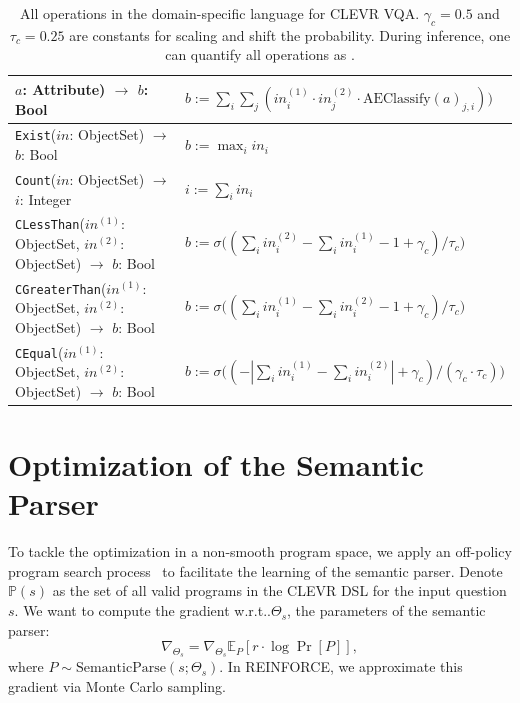 \documentclass{article} %
\makeatletter
\newcommand{\E}{\mathbb{E}}
\DeclareRobustCommand\onedot{\futurelet\@let@token\@onedot}
\def\@onedot{\ifx\@let@token.\else.\null\fi\xspace}
\def\wrt{w.r.t\onedot} \def\dof{d.o.f\onedot}
\makeatother
\begin{document}
\begin{table}[ht]
\begin{tabular}{p{}l}
        \hspace*{0.8cm} $a$: Attribute) $\rightarrow$ $b$: Bool & $b := \sum_{i} \sum_j (in^{(1)}_i \cdot in^{(2)}_j \cdot \mathrm{AEClassify}(a)_{j, i}))$\\ \midrule
        {\tt Exist}($in$: ObjectSet) $\rightarrow$ $b$: Bool & $b := \max_i in_i$\\ \midrule
        {\tt Count}($in$: ObjectSet) $\rightarrow$ $i$: Integer & $i := \sum_i in_i$\\ \midrule
        {\tt CLessThan}($in^{(1)}$: ObjectSet,\newline
        \hspace*{0.8cm}  $in^{(2)}$: ObjectSet) $\rightarrow$ $b$: Bool & $b := \sigma\big(( \sum_i in^{(2)}_i - \sum_i in^{(1)}_i - 1 + \gamma_c)/\tau_c\big)$\\ \midrule
        {\tt CGreaterThan}($in^{(1)}$: ObjectSet,\newline
        \hspace*{0.8cm}  $in^{(2)}$: ObjectSet) $\rightarrow$ $b$: Bool & $b := \sigma\big(( \sum_i in^{(1)}_i - \sum_i in^{(2)}_i - 1 + \gamma_c)/\tau_c\big)$\\ \midrule
        {\tt CEqual}($in^{(1)}$: ObjectSet,\newline
        \hspace*{0.8cm}  $in^{(2)}$: ObjectSet) $\rightarrow$ $b$: Bool & $b := \sigma\big(( -|\sum_i in^{(1)}_i - \sum_i in^{(2)}_i| + \gamma_c)/(\gamma_c \cdot \tau_c) \big)$\\ \midrule
    \end{tabular}
    \caption{All operations in the domain-specific language for CLEVR VQA. $\gamma_c=0.5$ and $\tau_c=0.25$ are constants for scaling and shift the probability. During inference, one can quantify all operations as \citet{kexin}.}
    \label{tab:program-executor}
\end{table}

\section{Optimization of the Semantic Parser}
\label{sec:app:reinforce}
To tackle the optimization in a non-smooth program space, we apply an off-policy program search process~\citep{Sutton2000Policy} to facilitate the learning of the semantic parser. Denote $\mathbb P(s)$ as the set of all valid programs in the CLEVR DSL for the input question $s$. We want to compute the gradient \wrt $\Theta_s$, the parameters of the semantic parser:
\[\nabla_{\Theta_s} = \nabla_{\Theta_s} \E_{P}[ r \cdot \log \Pr[P]],\]
where $P \sim \mathrm{SemanticParse}(s; {\Theta_s})$. In REINFORCE, we approximate this gradient via Monte Carlo sampling.
\end{document}

